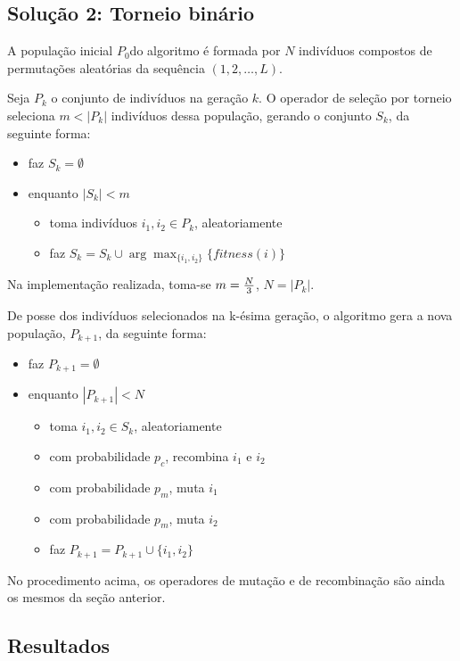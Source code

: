 \documentclass[a4paper]{article}
\begin{document}
\subsection{Solução 2: Torneio binário}

A população inicial $ P_{0} $do algoritmo é formada por $ N $ indivíduos compostos de permutações aleatórias da sequência $ (1,2,\dots,L) $.

Seja $ P_{k} $ o conjunto de indivíduos na geração $ k $. O operador de seleção por torneio seleciona $ m < |P_k| $ indivíduos dessa população, gerando o conjunto $ S_{k} $, da seguinte forma:

\begin{itemize}
 \item faz $ S_{k} = \emptyset $
 \item enquanto $ |S_{k}| < m $
\begin{itemize}
 \item toma indivíduos $ i_1, i_2 \in P_{k} $, aleatoriamente
 \item faz $ S_{k} = S_{k} \cup \arg\max_{\{i_1,i_2\}}\{fitness(i)\} $
\end{itemize}
\end{itemize}

Na implementação realizada, toma-se $ m = {N \over 3} $, $ N = |P_k| $.

De posse dos indivíduos selecionados na k-ésima geração, o algoritmo gera a nova população, $ P_{k+1} $, da seguinte forma:

\begin{itemize}
 \item faz $ P_{k+1} = \emptyset $
 \item enquanto $ |P_{k+1}| < N $
\begin{itemize}
 \item toma $ i_1, i_2 \in S_{k} $, aleatoriamente
 \item com probabilidade $ p_c $, recombina $ i_1 $ e $ i_2 $
 \item com probabilidade $ p_m $, muta $ i_1 $
 \item com probabilidade $ p_m $, muta $ i_2 $
 \item faz $ P_{k+1} = P_{k+1} \cup \{i_1, i_2\} $
\end{itemize}
\end{itemize}

No procedimento acima, os operadores de mutação e de recombinação são ainda os mesmos da seção anterior.

\subsection{Resultados}
\end{document}

